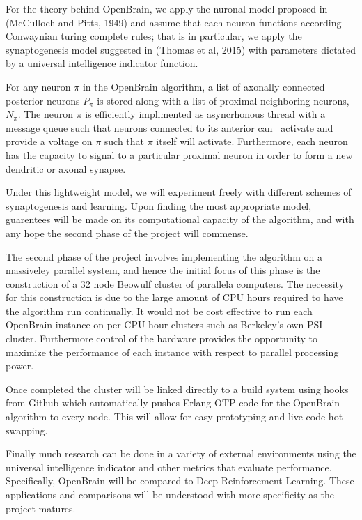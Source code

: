 \documentclass[letter]{article}
\begin{document}
For the theory behind OpenBrain, we apply the nuronal model proposed in (McCulloch and Pitts, 1949) and assume that each neuron
functions according Conwaynian turing complete rules; that is in particular, we apply the synaptogenesis model suggested in
(Thomas et al, 2015) with parameters dictated by a universal intelligence indicator function.

For any neuron $\pi$ in the OpenBrain algorithm, a list of axonally connected posterior neurons $P_\pi$ is stored along with
a list of proximal neighboring neurons, $N_\pi.$ The neuron $\pi$ is efficiently implimented as asyncrhonous thread with a message
queue such that neurons connected to its anterior can \ activate and provide a voltage on $\pi$ such that $\pi$ itself
will activate. Furthermore, each neuron has the capacity to signal to a particular proximal neuron in order to form a new dendritic or axonal 
synapse. 

Under this lightweight model, we will experiment freely with different schemes of synaptogenesis and learning. Upon finding the most
appropriate model, guarentees will be made on its computational capacity of the algorithm, and with any hope the second
phase of the project will commense.

The second phase of the project involves implementing the algorithm on a massiveley parallel system, and hence the initial
focus of this phase is the construction of a 32 node Beowulf cluster of parallela computers. The necessity for this construction
is due to the large amount of CPU hours required to have the algorithm run continually. It would not be cost effective to run
each OpenBrain instance on per CPU hour clusters such as Berkeley's own PSI cluster.  Furthermore control of the hardware
provides the opportunity to maximize the performance of each instance with respect to parallel processing power.

Once completed the cluster will be linked directly to a build system using hooks from Github which automatically pushes Erlang
OTP code for the OpenBrain algorithm to every node. This will allow for easy prototyping and live code hot swapping. 

Finally much research can be done in a variety of external environments using the universal intelligence indicator and other metrics that evaluate performance.
Specifically, OpenBrain will be compared to Deep Reinforcement Learning. These applications and comparisons will be 
understood with more specificity as the project matures.
\end{document}
